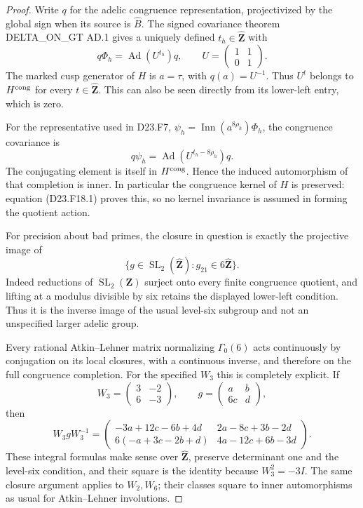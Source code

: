 \begin{proof}
Write $q$ for the adelic congruence representation,
projectivized by the global sign when its source
is $\widehat B$.  The signed covariance theorem
DELTA\_ON\_GT AD.1 gives a uniquely defined
$t_h\in\widehat{\mathbf Z}$ with
\[
 q\Phi_h=\operatorname{Ad}(U^{t_h})q,
 \qquad U=\begin{pmatrix}1&1\\0&1\end{pmatrix}.
\]
The marked cusp generator of $H$ is $a=\tau$,
with $q(a)=U^{-1}$.  Thus $U^t$ belongs to
$H^{\rm cong}$ for every $t\in\widehat{\mathbf Z}$.
This can also be seen directly from its lower-left
entry, which is zero.

For the representative used in D23.F7,
$\psi_h=\operatorname{Inn}(a^{8\rho_h})\Phi_h$,
the congruence covariance is
\[
 q\psi_h
  =\operatorname{Ad}(U^{t_h-8\rho_h})q.
\tag{D23.F18.1}
\]
The conjugating element is itself in $H^{\rm cong}$.
Hence the induced automorphism of that completion
is inner. In particular the congruence kernel of
$H$ is preserved: equation (D23.F18.1) proves this,
so no kernel invariance is assumed in forming
the quotient action.

For precision about bad primes, the closure in
question is exactly the projective image of
\[
 \{g\in\operatorname{SL}_2(\widehat{\mathbf Z}):
                         g_{21}\in6\widehat{\mathbf Z}\}.
\]
Indeed reductions of $\operatorname{SL}_2(\mathbf Z)$
surject onto every finite congruence quotient,
and lifting at a modulus divisible by six retains
the displayed lower-left condition. Thus it
is the inverse image of the usual level-six
subgroup and not an unspecified larger adelic
group.

Every rational Atkin--Lehner matrix normalizing
$\Gamma_0(6)$ acts continuously by conjugation
on its local closures, with a continuous inverse,
and therefore on the full congruence completion.
For the specified $W_3$ this is completely
explicit. If
\[
 W_3=\begin{pmatrix}3&-2\\6&-3\end{pmatrix},
 \qquad g=\begin{pmatrix}a&b\\6c&d\end{pmatrix},
\]
then
\[
 W_3gW_3^{-1}=
 \begin{pmatrix}
 -3a+12c-6b+4d&2a-8c+3b-2d\\
 6(-a+3c-2b+d)&4a-12c+6b-3d
 \end{pmatrix}.
\]
These integral formulas make sense over
$\widehat{\mathbf Z}$, preserve determinant one
and the level-six condition, and their square
is the identity because $W_3^2=-3I$.
The same closure argument applies to $W_2,W_6$;
their classes square to inner automorphisms as
usual for Atkin--Lehner involutions.


\end{proof}
